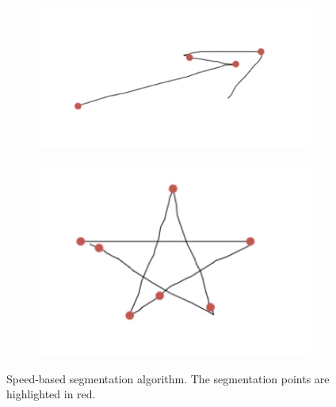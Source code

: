 \begin{figure}
	\centering
	\begin{subfigure}{0.45\textwidth}
		\centering
		\includegraphics[scale=0.4]{./img/seg_results_arrow_speed.jpg}
		\caption{}
		\label{fig:seg_results_arrow_speed}
	\end{subfigure}
	\begin{subfigure}{0.45\textwidth}
		\centering
		\includegraphics[scale=0.5]{./img/seg_results_pentagram_speed.jpg}
		\caption{}
		\label{fig:seg_results_pentagram_speed}
	\end{subfigure}
	\caption{Speed-based segmentation algorithm. The segmentation points are highlighted in red.}
	\label{fig:seg_results_speed}
\end{figure}


